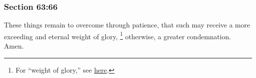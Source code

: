	\subsubsection{Section 63:66} %
		\label{DC63-66}

		These things remain to overcome through patience, that such may receive a more exceeding and eternal weight of glory,%
			\footnote{%
				For ``weight of glory,'' see \hyperref[GLORY-PHRASES]{here}.
				}
		otherwise, a greater condemnation.  Amen.

